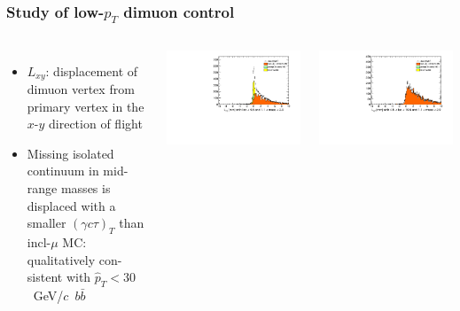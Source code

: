 \documentclass[compress]{beamer}
\begin{document}
\begin{frame}
\frametitle{Study of low-$p_T$ dimuon control}

\begin{columns}
\begin{itemize}
\item $L_{xy}$: displacement of dimuon vertex from primary vertex in
  the $x$-$y$ direction of flight
\item Missing isolated continuum in mid-range masses is displaced with
  a smaller $(\gamma c\tau)_T$ than incl-$\mu$ MC: qualitatively con- sistent with
  \mbox{$\hat{p}_T < 30$~GeV/$c$ $b\bar{b}$\hspace{-1 cm}}
\end{itemize}

\includegraphics[width=1.2\linewidth]{lowdimuon_lxy_midmass_isolated.pdf}

\includegraphics[width=\linewidth]{lowdimuon_lxy_midmass_isosideband.pdf}


\end{columns}
\end{frame}
\end{document}
